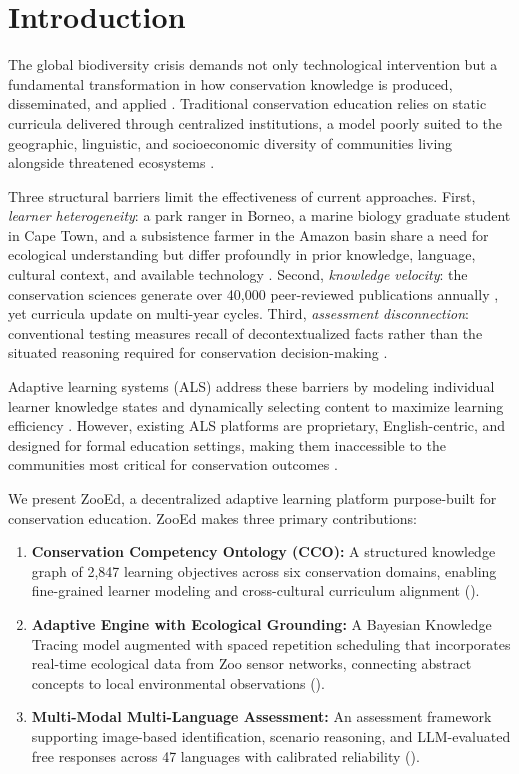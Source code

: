 \documentclass[11pt,a4paper]{article}
\begin{document}
\section{Introduction}
\label{sec:introduction}

The global biodiversity crisis demands not only technological intervention but a fundamental transformation in how conservation knowledge is produced, disseminated, and applied \citep{diaz2019global}.
Traditional conservation education relies on static curricula delivered through centralized institutions, a model poorly suited to the geographic, linguistic, and socioeconomic diversity of communities living alongside threatened ecosystems \citep{brewer2020conservation}.

Three structural barriers limit the effectiveness of current approaches.
First, \emph{learner heterogeneity}: a park ranger in Borneo, a marine biology graduate student in Cape Town, and a subsistence farmer in the Amazon basin share a need for ecological understanding but differ profoundly in prior knowledge, language, cultural context, and available technology \citep{ardoin2020environmental}.
Second, \emph{knowledge velocity}: the conservation sciences generate over 40,000 peer-reviewed publications annually \citep{fisher2022growth}, yet curricula update on multi-year cycles.
Third, \emph{assessment disconnection}: conventional testing measures recall of decontextualized facts rather than the situated reasoning required for conservation decision-making \citep{stern2014value}.

Adaptive learning systems (ALS) address these barriers by modeling individual learner knowledge states and dynamically selecting content to maximize learning efficiency \citep{vanlehn2011relative}.
However, existing ALS platforms are proprietary, English-centric, and designed for formal education settings, making them inaccessible to the communities most critical for conservation outcomes \citep{kulik2016effectiveness}.

We present ZooEd, a decentralized adaptive learning platform purpose-built for conservation education.
ZooEd makes three primary contributions:

\begin{enumerate}[leftmargin=*]
    \item \textbf{Conservation Competency Ontology (CCO):} A structured knowledge graph of 2,847 learning objectives across six conservation domains, enabling fine-grained learner modeling and cross-cultural curriculum alignment ().
    \item \textbf{Adaptive Engine with Ecological Grounding:} A Bayesian Knowledge Tracing model augmented with spaced repetition scheduling that incorporates real-time ecological data from Zoo sensor networks, connecting abstract concepts to local environmental observations ().
    \item \textbf{Multi-Modal Multi-Language Assessment:} An assessment framework supporting image-based identification, scenario reasoning, and LLM-evaluated free responses across 47 languages with calibrated reliability ().
\end{enumerate}
\end{document}
